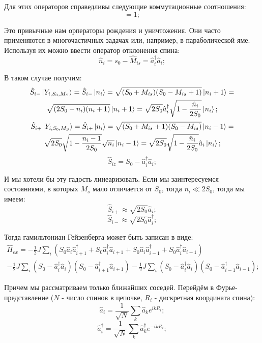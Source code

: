 \documentclass[a4paper, 14pt, russian]{article}
\newcommand{\be}{\begin{equation}}
\newcommand{\ee}{\end{equation}}
\begin{document}
	Для этих операторов справедливы следующие коммутационные соотношения:
	\be
		[\hat{a}_i;\hat{a}_i^\dagger] = 1;
	\ee

	Это привычные нам орператоры рождения и уничтожения. Они часто применяются
	в многочастичных задачах или, например, в параболической яме. Используя
	их можно ввести оператор отклонения спина:
	\be
		\hat{n}_i = s_0 - \hat{M}_{is} = \hat{a}^\dagger_i \hat{a}_i;
	\ee

	В таком случае получим:
	\begin{multline}
		\label{eq121}
		\hat{S}_{i-} \ket{Y_{i,S_0,M_S}} = \hat{S}_{i-} \ket{n_i} = 
			\sqrt{(S_0 + M_{is})(S_0 - M_{is} + 1)} \ket{n_i + 1} = \\
			\sqrt{(2S_0 - n_i)(n_i + 1)} \ket{n_i + 1} = 
			\sqrt{2S_0} \hat{a}_i^\dagger \sqrt{1 - \frac{\hat{n}_i}{2S_0}} \ket{n_i};
	\end{multline}
	\begin{multline}
		\hat{S}_{i+} \ket{Y_{i,S_0,M_S}} = \hat{S}_{i+} \ket{n_i} = 
			\sqrt{(S_0 + M_{is} + 1)(S_0 - M_{is})} \ket{n_i - 1} = \\
			\sqrt{2S_0}\sqrt{1 - \frac{n_i -1}{2S_0}} \sqrt{n_i} \ket{n_i - 1} = 
			\sqrt{2S_0} \sqrt{1 - \frac{\hat{n}_i}{2S_0}} \hat{a}_i \ket{n_i};
	\end{multline}
	\be
		\hat{S}_{iz} = S_0 - \hat{a}_i^\dagger \hat{a}_i;
	\ee


	И мы хотели бы эту гадость линеаризовать. Если мы заинтересуемся состояниями,
	в которых $M_s$  мало отличается от $S_0$, тогда $n_i \ll 2S_0$, тогда
	мы имеем:
	\be
		\label{eq122}
		\hat{S}_{i+} \approx \sqrt{2S_0} \hat{a}_i;
	\ee
	\be
		\hat{S}_{i-} \approx \sqrt{2S_0} \hat{a}_i^\dagger;
	\ee

	Тогда гамильтониан Гейзенберга может быть записан в виде:
	\begin{multline}
		\label{eq123}
		\hat{H}_{ex} = - \frac{1}{2} J \sum_i (S_0 \hat{a}_i \hat{a}^\dagger_{i+1}
			+ S_0 \hat{a}_i^\dagger \hat{a}_{i+1} + 
			S_0 \hat{a}_i \hat{a}_{i-1}^\dagger + S_0 \hat{a}_i^\dagger \hat{a}_{i-1})\\ -
			\frac{1}{2} J \sum_i (S_0 - \hat{a}_i^\dagger \hat{a}_i)
			(S_0 - \hat{a}_{i+1}^\dagger \hat{a}_{i+1}) - 
			\frac{1}{2} J \sum_i (S_0 - \hat{a}_i^\dagger \hat{a}_i)
			(S_0 - \hat{a}_{i-1}^\dagger \hat{a}_{i-1});
	\end{multline}

	Причем мы рассматриваем только ближайших соседей. Перейдём в 
	Фурье-представление ($N$ - число спинов в цепочке,
	$R_i$ - дискретная координата спина):
	\be
		\hat{a}_i = \frac{1}{\sqrt N} \sum_{k} \hat{a}_{k} e^{ikR_i};
	\ee
	\be
		\hat{a}_i^\dagger = \frac{1}{\sqrt N} \sum_{k} \hat{a}_{k}^\dagger e^{-ikR_i};
	\ee
\end{document}
